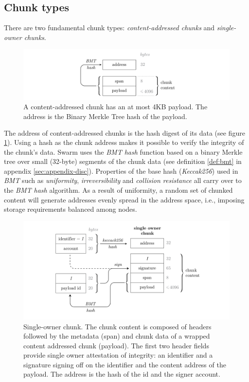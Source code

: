 \subsection{Chunk types}

There are two fundamental chunk types: \emph{content-addressed chunks} and \emph{single-owner chunks}. 


\begin{figure}[!ht]
   \centering
   \includegraphics[width=\textwidth]{fig/content-addressed-chunk-3.pdf}
   \caption[Content addressed chunk]{A content-addressed chunk has an at most 4KB payload. The address is the Binary Merkle Tree hash of the payload.}
   \label{fig:content-addressed-chunk}
\end{figure}

The address of content-addressed chunks is the hash digest of its data (see figure 
\ref{fig:content-addressed-chunk}). Using a hash as the chunk address makes it possible to verify the integrity of the chunk's data. Swarm uses the \emph{BMT hash} function based on a binary Merkle tree over small (32-byte) segments of the chunk data (see definition \ref{def:bmt} in appendix \ref{sec:appendix-disc}). Properties of the base hash (\emph{Keccak256}) used in \emph{BMT} such as \emph{uniformity}, \emph{irreversibility} and \emph{collision resistance} all carry over to the \emph{BMT hash} algorithm. As a result of uniformity, a random set of chunked content will generate addresses evenly spread in the address space, i.e., imposing storage requirements balanced among nodes.




\begin{figure}[!ht]
   \centering
   \includegraphics[width=\textwidth]{fig/single-owner-chunk.pdf}
   \caption[Single-owner chunk]{Single-owner chunk. The chunk content is composed of headers followed by the metadata (span) and chunk data of a wrapped content addressed chunk (payload). The first two header fields provide single owner attestation of integrity: an identifier and a signature signing off on the identifier and the content address of the payload. The address is the hash of the id and the signer account.}
   \label{fig:single-owner-chunks}
\end{figure}


